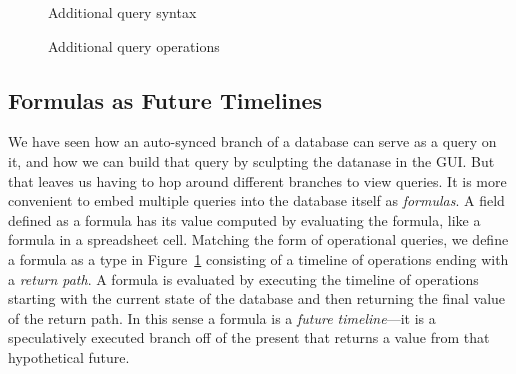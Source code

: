 \documentclass[english,submission]{programming}
\theoremstyle{definition}
\begin{document}
\begin{figure}
  \caption{Additional query syntax}
  \label{fig:query-syntax}
\end{figure}
\begin{figure}
  \caption{Additional query operations}
  \label{fig:query-operations}
\end{figure}


\subsection{Formulas as Future Timelines}

We have seen how an auto-synced branch of a database can serve as a query on it, and how we can build that query by sculpting the datanase in the GUI. But that leaves us having to hop around different branches to view queries. It is more convenient to embed multiple queries into the database itself as \textit{formulas}. A field defined as a formula has its value computed by evaluating the formula, like a formula in a spreadsheet cell. Matching the form of operational queries, we define a formula as a type in Figure~\ref{fig:query-syntax} consisting of a timeline of operations ending with a \textit{return path}. A formula is evaluated by executing the timeline of operations starting with the current state of the database and then returning the final value of the return path. In this sense a formula is a \textit{future timeline}---it is a speculatively executed branch off of the present that returns a value from that hypothetical future.
\end{document}
